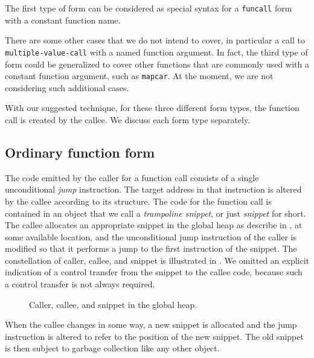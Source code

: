 \noindent
The first type of form can be considered as special syntax for a
\texttt{funcall} form with a constant function name.

There are some other cases that we do not intend to cover, in
particular a call to \texttt{multiple-value-call} with a named
function argument.  In fact, the third type of form could be
generalized to cover other functions that are commonly used with
a constant function argument, such as \texttt{mapcar}.  At the moment,
we are not considering such additional cases.

With our suggested technique, for these three different form types,
the function call is created by the callee.  We discuss each form type
separately.

\subsection{Ordinary function form}

The code emitted by the caller for a function call consists of a
single unconditional \emph{jump} instruction.  The target address in
that instruction is altered by the callee according to its structure.
The code for the function call is contained in an object that we call
a \emph{trampoline snippet}, or just \emph{snippet} for short.  The
callee allocates an appropriate snippet in the global heap as describe
in , at some available location, and the
unconditional jump instruction of the caller is modified so that it
performs a jump to the first instruction of the snippet.  The
constellation of caller, callee, and snippet is illustrated in
.  We omitted an explicit indication of a control
transfer from the snippet to the callee code, because such a control
transfer is not always required.

\begin{figure}
\begin{center}
\end{center}
\caption{\label{fig-snippet}
Caller, callee, and snippet in the global heap.}
\end{figure}

When the callee changes in some way, a
new snippet is allocated and the jump instruction is altered to refer
to the position of the new snippet.  The old snippet is then subject
to garbage collection like any other object.

